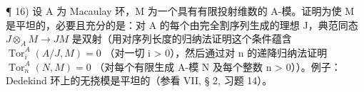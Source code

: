 ¶ 16) 设 A 为 Macaulay 环，M 为一个具有有限投射维数的 A-模。证明为使 M 是平坦的，必要且充分的是：对 A 的每个由完全割序列生成的理想 J，典范同态 \(J \otimes_{A} M \to JM\) 是双射（用对序列长度的归纳法证明这个条件蕴含 \(\operatorname{Tor}_{i}^{A}(A/J, M) = 0\) （对一切 i \textgreater{} 0），然后通过对 n 的递降归纳法证明 \(\operatorname{Tor}_{n}^{A}(N, M) = 0\) （对每个有限生成 A-模 N 及每个整数 n \textgreater{} 0））。例子：Dedekind 环上的无挠模是平坦的（参看 VII, § 2, 习题 14）。
\relax{}
